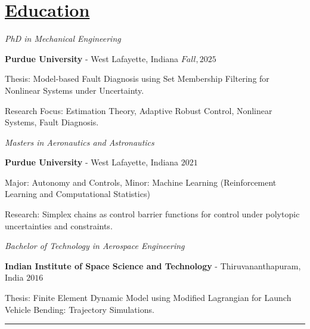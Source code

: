 \section*{\underline{Education}}

\noindent \textit{PhD in Mechanical Engineering}

\textbf{Purdue University} - West Lafayette, Indiana \hfill $Fall, 2025$

Thesis: Model-based Fault Diagnosis using Set Membership Filtering for Nonlinear Systems under Uncertainty.

Research Focus: Estimation Theory, Adaptive Robust Control, Nonlinear Systems, Fault Diagnosis.

\medskip

\noindent \textit{Masters in Aeronautics and Astronautics}

\textbf{Purdue University} - West Lafayette, Indiana \hfill $2021$

Major: Autonomy and Controls, Minor: Machine Learning (Reinforcement Learning and Computational Statistics)

Research: Simplex chains as control barrier functions for control under polytopic uncertainties and constraints.

\medskip

\noindent \textit{Bachelor of Technology in Aerospace Engineering }

\textbf{Indian Institute of Space Science and Technology} - Thiruvananthapuram, India \hfill $2016 $

Thesis: Finite Element Dynamic Model using Modified Lagrangian for Launch Vehicle Bending: Trajectory Simulations.

\noindent\rule{\textwidth}{0.4pt}
